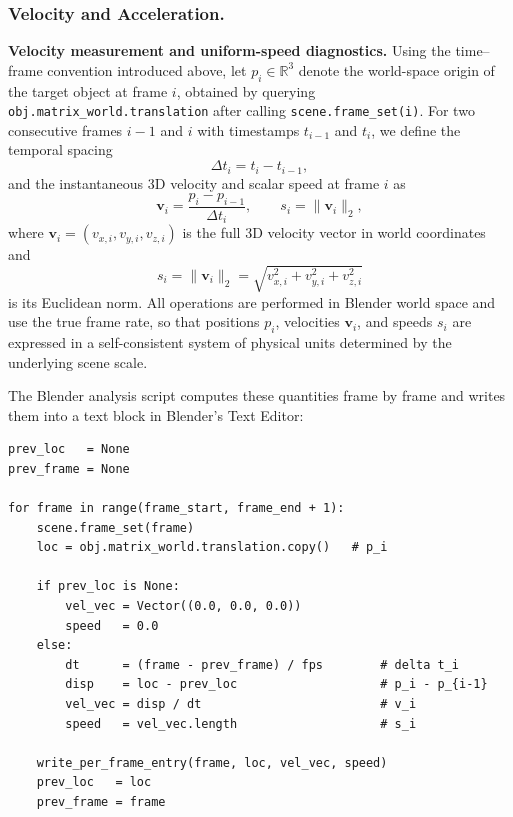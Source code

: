 \subsubsection{Velocity and Acceleration.}

\noindent\textbf{Velocity measurement and uniform-speed diagnostics.}
Using the time--frame convention introduced above, let \(p_i \in \mathbb{R}^3\) denote the world-space origin of the target object at frame \(i\), obtained by querying \texttt{obj.matrix\_world.translation} after calling \texttt{scene.frame\_set(i)}. For two consecutive frames \(i-1\) and \(i\) with timestamps \(t_{i-1}\) and \(t_i\), we define the temporal spacing
\[
\Delta t_i = t_i - t_{i-1},
\]
and the instantaneous 3D velocity and scalar speed at frame \(i\) as
\[
\mathbf{v}_i = \frac{p_i - p_{i-1}}{\Delta t_i},
\qquad
s_i = \|\mathbf{v}_i\|_2,
\]
where \(\mathbf{v}_i = (v_{x,i}, v_{y,i}, v_{z,i})\) is the full 3D velocity vector in world coordinates and
\[
s_i = \lVert \mathbf{v}_i \rVert_2
= \sqrt{v_{x,i}^2 + v_{y,i}^2 + v_{z,i}^2}
\]
is its Euclidean norm. All operations are performed in Blender world space and use the true frame rate, so that positions \(p_i\), velocities \(\mathbf{v}_i\), and speeds \(s_i\) are expressed in a self-consistent system of physical units determined by the underlying scene scale.

The Blender analysis script computes these quantities frame by frame and writes them into a text block in Blender's Text Editor:
\begin{verbatim}
prev_loc   = None
prev_frame = None

for frame in range(frame_start, frame_end + 1):
    scene.frame_set(frame)
    loc = obj.matrix_world.translation.copy()   # p_i

    if prev_loc is None:
        vel_vec = Vector((0.0, 0.0, 0.0))
        speed   = 0.0
    else:
        dt      = (frame - prev_frame) / fps        # delta t_i
        disp    = loc - prev_loc                    # p_i - p_{i-1}
        vel_vec = disp / dt                         # v_i
        speed   = vel_vec.length                    # s_i

    write_per_frame_entry(frame, loc, vel_vec, speed)
    prev_loc   = loc
    prev_frame = frame
\end{verbatim}

